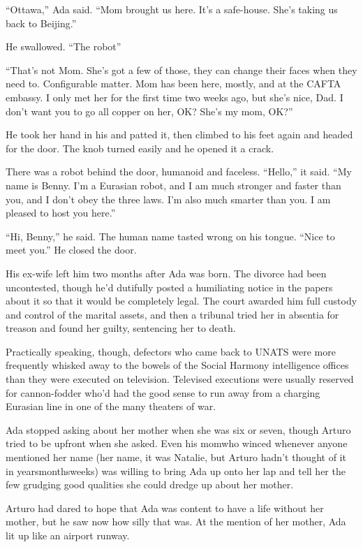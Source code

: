“Ottawa,” Ada said. “Mom brought us here. It’s a safe-house. She’s
taking us back to Beijing.”

He swallowed. “The robot{\dash}”

“That’s not Mom. She’s got a few of those, they can change their
faces when they need to. Configurable matter. Mom has been here,
mostly, and at the CAFTA embassy. I only met her for the first time
two weeks ago, but she’s nice, Dad. I don’t want you to go all
copper on her, OK? She’s my mom, OK?”

He took her hand in his and patted it, then climbed to his feet
again and headed for the door. The knob turned easily and he opened
it a crack.

There was a robot behind the door, humanoid and faceless. “Hello,”
it said. “My name is Benny. I’m a Eurasian robot, and I am much
stronger and faster than you, and I don’t obey the three laws. I’m
also much smarter than you. I am pleased to host you here.”

“Hi, Benny,” he said. The human name tasted wrong on his tongue.
“Nice to meet you.” He closed the door.

\tb

His ex-wife left him two months after Ada was born. The divorce had
been uncontested, though he’d dutifully posted a humiliating notice
in the papers about it so that it would be completely legal. The
court awarded him full custody and control of the marital assets,
and then a tribunal tried her in absentia for treason and found her
guilty, sentencing her to death.

Practically speaking, though, defectors who came back to UNATS were
more frequently whisked away to the bowels of the Social Harmony
intelligence offices than they were executed on television.
Televised executions were usually reserved for cannon-fodder who’d
had the good sense to run away from a charging Eurasian line in one
of the many theaters of war.

Ada stopped asking about her mother when she was six or seven,
though Arturo tried to be upfront when she asked. Even his mom{\dash}who
winced whenever anyone mentioned her name (her name, it was
Natalie, but Arturo hadn’t thought of it in years{\dash}months{\dash}weeks) was
willing to bring Ada up onto her lap and tell her the few grudging
good qualities she could dredge up about her mother.

Arturo had dared to hope that Ada was content to have a life
without her mother, but he saw now how silly that was. At the
mention of her mother, Ada lit up like an airport runway.

